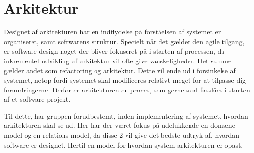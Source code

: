 \chapter{Arkitektur}\label{ch:Arkitektur}

Designet af arkitekturen har en indflydelse på forståelsen af systemet er organiseret, samt softwarens struktur. Specielt når det gælder den agile tilgang, er software design noget der bliver fokuseret på i starten af processen, da inkrementel udvikling af arkitektur vil ofte give vanskeligheder. Det samme gælder andet som refactoring og arkitektur. Dette vil ende ud i forsinkelse af systemet, netop fordi systemet skal modificeres relativt meget for at tilpasse dig forandringerne. Derfor er arkitekturen en proces, som gerne skal fasslåes i starten af et software projekt. \cite{Sommerville}

Til dette, har gruppen forudbestemt, inden implementering af systemet, hvordan arkitekturen skal se ud. Her har der været fokus på udelukkende en domæne-model og en relations model, da disse 2 vil give det bedste udtryk af, hvordan software er designet. Hertil en model for hvordan system arkitekturen er opast. 

